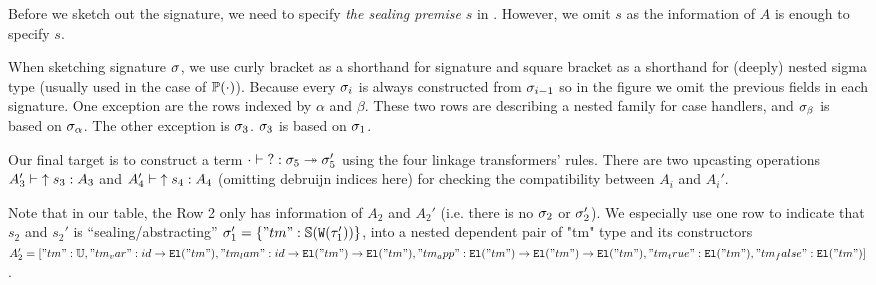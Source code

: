 Before we sketch out the signature, we need to specify \textit{the sealing premise} $s$ in . However, we omit $s$ as the information of $A$ is enough to specify $s$.

When sketching signature $\sigma$, we use curly bracket as a shorthand for signature and square bracket as a shorthand for (deeply) nested sigma type (usually used in the case of $\mathbb{P}({\cdot})$). Because every $\sigma_i$ is always constructed from $\sigma_{i-1}$ so in the figure we omit the previous fields in each signature.  One exception are the rows indexed by $\alpha$ and $\beta$. These two rows are describing a nested family for case handlers, and $\sigma_\beta$ is based on $\sigma_\alpha$. The other exception is $\sigma_3$. $\sigma_3$ is based on $\sigma_1$.


Our final target is to construct a term $ {\cdot} \vdash {?} : {\sigma_5} \twoheadrightarrow {\ensuremath{\sigma}_5'}$ using the four linkage transformers' rules. There are two upcasting operations $ {A_3'} \vdash {\uparrow s_3} : {A_3} $ and $ {A_4'} \vdash {\uparrow s_4} : {A_4} $ (omitting debruijn indices here) for checking the compatibility between $A_i$ and $A_i'$.

Note that in our table, the Row 2 only has information of $A_2$ and $A_2'$ (i.e. there is no $\sigma_2$ or $\sigma_2'$). We especially use one row to indicate that $s_2$ and $s_2'$ is ``sealing/abstracting'' $\sigma_1' = \{"tm" : \mathbb{S}({\texttt{W}({\tau_1'})})\}$, into a nested dependent pair of "tm" type and its constructors $A_2' = ["tm" : \mathbb{U}, "tm_var" : id \to \texttt{El}({"tm"}), "tm_lam" : id \to \texttt{El}({"tm"}) \to \texttt{El}({"tm"}), "tm_app" : \texttt{El}({"tm"}) \to \texttt{El}({"tm"}) \to \texttt{El}({"tm"}), "tm_true" : \texttt{El}({"tm"}), "tm_false" : \texttt{El}({"tm"})]$.